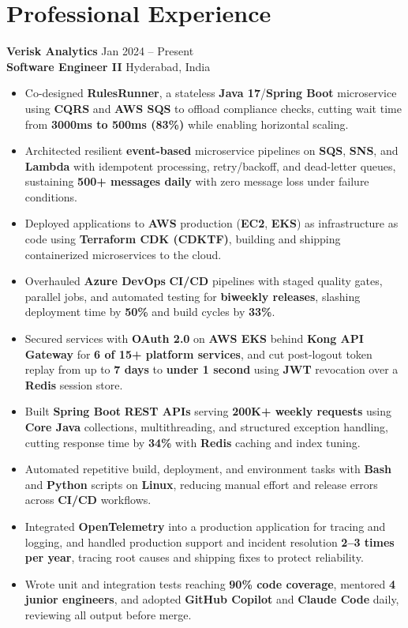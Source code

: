 \documentclass[a4paper,10pt]{article}
\begin{document}
\section*{Professional Experience}

\textbf{Verisk Analytics} \hfill Jan 2024 -- Present \\
\textbf{Software Engineer II} \hfill Hyderabad, India

\begin{itemize}[leftmargin=*]
    \item Co-designed \textbf{RulesRunner}, a stateless \textbf{Java 17}/\textbf{Spring Boot} microservice using \textbf{CQRS} and \textbf{AWS SQS} to offload compliance checks, cutting wait time from \textbf{3000ms to 500ms (83\%)} while enabling horizontal scaling.
    \item Architected resilient \textbf{event-based} microservice pipelines on \textbf{SQS}, \textbf{SNS}, and \textbf{Lambda} with idempotent processing, retry/backoff, and dead-letter queues, sustaining \textbf{500+ messages daily} with zero message loss under failure conditions.
    \item Deployed applications to \textbf{AWS} production (\textbf{EC2}, \textbf{EKS}) as infrastructure as code using \textbf{Terraform CDK (CDKTF)}, building and shipping containerized microservices to the cloud.
    \item Overhauled \textbf{Azure DevOps} \textbf{CI/CD} pipelines with staged quality gates, parallel jobs, and automated testing for \textbf{biweekly releases}, slashing deployment time by \textbf{50\%} and build cycles by \textbf{33\%}.
    \item Secured services with \textbf{OAuth 2.0} on \textbf{AWS EKS} behind \textbf{Kong API Gateway} for \textbf{6 of 15+ platform services}, and cut post-logout token replay from up to \textbf{7 days} to \textbf{under 1 second} using \textbf{JWT} revocation over a \textbf{Redis} session store.
    \item Built \textbf{Spring Boot} \textbf{REST APIs} serving \textbf{200K+ weekly requests} using \textbf{Core Java} collections, multithreading, and structured exception handling, cutting response time by \textbf{34\%} with \textbf{Redis} caching and index tuning.
    \item Automated repetitive build, deployment, and environment tasks with \textbf{Bash} and \textbf{Python} scripts on \textbf{Linux}, reducing manual effort and release errors across \textbf{CI/CD} workflows.
    \item Integrated \textbf{OpenTelemetry} into a production application for tracing and logging, and handled production support and incident resolution \textbf{2--3 times per year}, tracing root causes and shipping fixes to protect reliability.
    \item Wrote unit and integration tests reaching \textbf{90\% code coverage}, mentored \textbf{4 junior engineers}, and adopted \textbf{GitHub Copilot} and \textbf{Claude Code} daily, reviewing all output before merge.
\end{itemize}
\end{document}
